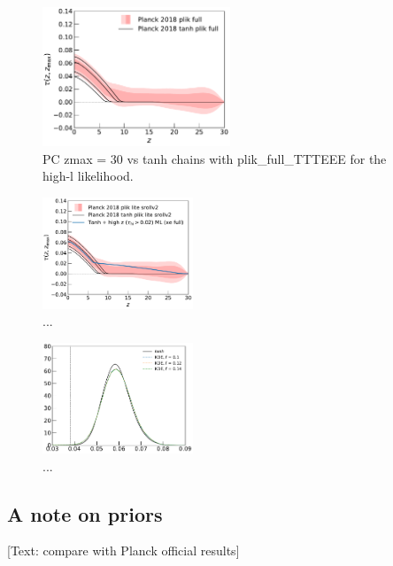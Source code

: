 \documentclass[prd,twocolumn,amsmath,amssymb,floatfix,superscriptaddress,nofootinbib]{revtex4-1}
\begin{document}
\begin{figure}
\includegraphics[width=0.5\textwidth]{results/direct_mcmc/pl18_plots_zmax30/plot_pub_tau_gtz_dz_0p1_pl18_pc_zmax30_plikfull_and_pl18_tanh_post_plikfull.pdf}
\caption{PC zmax = 30 vs tanh chains with plik\_full\_TTTEEE for the high-l likelihood.
}
\label{fig:}
\end{figure}


\begin{figure}[t]
\includegraphics[width=0.40\textwidth]{plots/plot_tau_gtz.pdf}
\caption{...
}
\label{fig:}
\end{figure}


\begin{figure}
\includegraphics[width=0.40\textwidth]{plots/pl18_pc_zmax30_pliklite_srollv2_1015_tau_posterior_fraccov_1p0_burnin_10000_yes_norm_gaussian0p1_0p12_0p14.pdf}
\caption{...
}
\label{fig:}
\end{figure}


\subsection{A note on priors}

[Text: compare with Planck official results]
\end{document}
